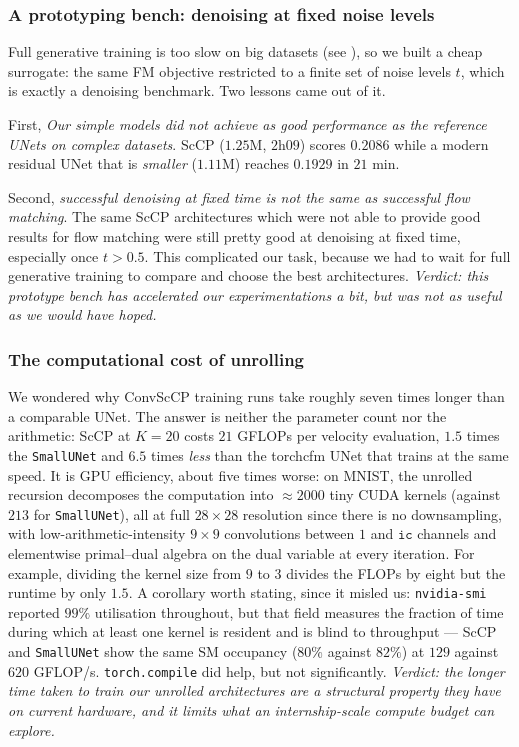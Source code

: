 \documentclass[a4paper,11pt]{article}
\theoremstyle{plain}{\theorembodyfont{\rmfamily}%
\newtheorem{proposition}[theorem]{Proposition}}
\theoremstyle{plain}{\theorembodyfont{\rmfamily}%
\newtheorem{notation}[theorem]{Notation}}
\theoremstyle{plain}{\theorembodyfont{\rmfamily}%
\newtheorem{assumption}[theorem]{Assumption}}
\theoremstyle{plain}{\theorembodyfont{\rmfamily}%
\newtheorem{problem}[theorem]{Problem}}
\theoremstyle{plain}{\theorembodyfont{\rmfamily}%
\newtheorem{example}[theorem]{Example}}
\theoremstyle{plain}{\theorembodyfont{\rmfamily}%
\newtheorem{remark}[theorem]{Remark}}
\theoremstyle{plain}{\theorembodyfont{\rmfamily}%
\newtheorem{definition}[theorem]{Definition}}
\theoremstyle{plain}{\theorembodyfont{\rmfamily}%
\newtheorem{question}[theorem]{Question}}
\numberwithin{equation}{section}
\begin{document}
\subsubsection{A prototyping bench: denoising at fixed noise levels}
\label{subsec:denoiseprobe}

Full generative training is too slow on big datasets (see
), so we built a cheap surrogate: the same FM objective restricted
to a finite set of noise levels $t$, which is exactly a denoising benchmark. Two lessons came out of it.

First, \emph{Our simple models did not achieve as good performance as the reference UNets on complex datasets}. ScCP ($1.25$M, $2$h$09$)
scores $0.2086$ while a modern residual UNet that is
\emph{smaller} ($1.11$M) reaches $0.1929$ in $21$ min.

Second, \emph{successful denoising at fixed time is not the same as successful flow matching}. The same ScCP architectures which were not able to provide good results for flow matching were still pretty good at denoising at fixed time, especially once $t > 0.5$. This complicated our task, because we had to wait for full generative training to compare and choose the best architectures.
\emph{Verdict: this prototype bench has accelerated our experimentations a bit, but was not as useful as we would have hoped.}

\subsubsection{The computational cost of unrolling}
\label{subsec:cost}

We wondered why ConvScCP training runs take roughly seven times longer than a
comparable UNet. The answer is neither the parameter count nor the arithmetic:
ScCP at $K=20$ costs $21$ GFLOPs per velocity evaluation, $1.5$ times the
\texttt{SmallUNet} and $6.5$ times \emph{less} than the torchcfm UNet that trains at
the same speed. It is GPU efficiency, about five times worse: on MNIST, the unrolled recursion
decomposes the computation into $\approx 2000$ tiny CUDA kernels (against $213$ for
\texttt{SmallUNet}), all at full $28\times28$ resolution since there is no
downsampling, with low-arithmetic-intensity $9\times9$ convolutions between $1$ and
$\texttt{ic}$ channels and elementwise primal--dual algebra on the dual
variable at every iteration. For example, dividing the kernel size from
$9$ to $3$ divides the FLOPs by eight but the runtime by only $1.5$. A corollary
worth stating, since it misled us: \texttt{nvidia-smi} reported $99\%$ utilisation
throughout, but that field measures the fraction of time during which at least one
kernel is resident and is blind to throughput --- ScCP and \texttt{SmallUNet} show
the same SM occupancy ($80\%$ against $82\%$) at $129$ against $620$ GFLOP/s.
\texttt{torch.compile} did help, but not significantly. \emph{Verdict: the longer time taken to train our unrolled architectures are a structural property they have on current hardware, and it limits what an internship-scale compute budget can explore.}
\end{document}
